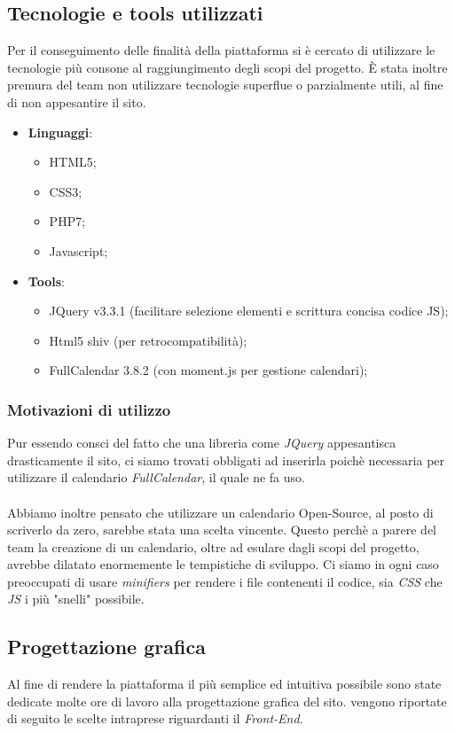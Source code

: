 \documentclass[12pt]{article}
\begin{document}
\subsection{Tecnologie e tools utilizzati}
Per il conseguimento delle finalit\`a della piattaforma si \`e cercato di utilizzare le tecnologie pi\`u consone al raggiungimento degli scopi del progetto. \`E stata inoltre premura del team non utilizzare tecnologie superflue o parzialmente utili, al fine di non appesantire il sito.
	\begin{itemize}
		\item \textbf{Linguaggi}:
		\begin{itemize}
			\item HTML5;
			\item CSS3;
			\item PHP7;
			\item Javascript;
		\end{itemize}
		\item \textbf{Tools}:
		\begin{itemize}
			\item JQuery v3.3.1 (facilitare selezione elementi e scrittura concisa codice JS);
			\item Html5 shiv (per retrocompatibilità);
			\item FullCalendar 3.8.2 (con moment.js per gestione calendari);
		\end{itemize}
	\end{itemize}
\subsubsection{Motivazioni di utilizzo}
Pur essendo consci del fatto che una libreria come \emph{JQuery} appesantisca drasticamente il sito, ci siamo trovati obbligati ad inserirla poich\`e necessaria per utilizzare il calendario \emph{FullCalendar}, il quale ne fa uso. \\\\
Abbiamo inoltre pensato che utilizzare un calendario Open-Source, al posto di scriverlo da zero, sarebbe stata una scelta vincente. Questo perch\`e a parere del team la creazione di un calendario, oltre ad esulare dagli scopi del progetto, avrebbe dilatato enormemente le tempistiche di sviluppo. Ci siamo in ogni caso preoccupati di usare \emph{minifiers} per rendere i file contenenti il codice, sia \emph{CSS} che \emph{JS} i pi\`u "snelli" possibile.



\subsection{Progettazione grafica}
Al fine di rendere la piattaforma il pi\`u semplice ed intuitiva possibile sono state dedicate molte ore di lavoro alla progettazione grafica del sito. vengono riportate di seguito le scelte intraprese riguardanti il \emph{Front-End}.
	
\end{document}
